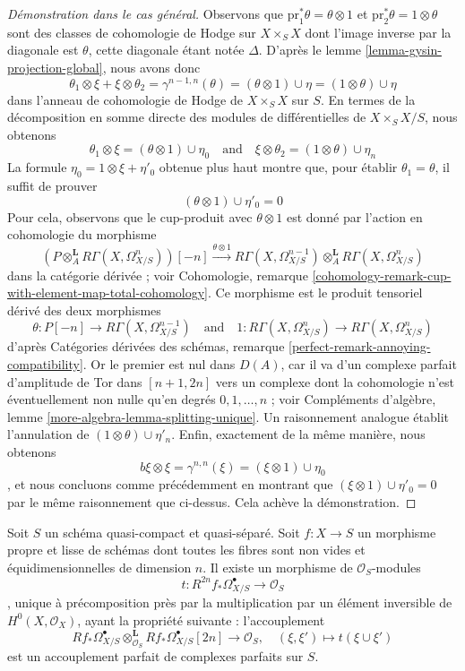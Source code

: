\begin{proof}[Démonstration dans le cas général]
\medskip\noindent
Observons que $\text{pr}_1^*\theta = \theta \otimes 1$
et $\text{pr}_2^*\theta = 1 \otimes \theta$ sont des
classes de cohomologie de Hodge sur
$X \times_S X$ dont l'image inverse par la diagonale est $\theta$, cette diagonale étant notée $\Delta$.
D'après le lemme \ref{lemma-gysin-projection-global}, nous avons donc
$$
\theta_1 \otimes \xi + \xi \otimes \theta_2 =
\gamma^{n - 1, n}(\theta) =
(\theta \otimes 1) \cup \eta =
(1 \otimes \theta) \cup \eta
$$
dans l'anneau de cohomologie de Hodge de $X \times_S X$ sur $S$.
En termes de la décomposition en somme directe des modules
de différentielles de $X \times_S X/S$, nous obtenons
$$
\theta_1 \otimes \xi =
(\theta \otimes 1) \cup \eta_0
\quad\text{and}\quad
\xi \otimes \theta_2 =
(1 \otimes \theta) \cup \eta_n
$$
La formule $\eta_0 = 1 \otimes \xi + \eta'_0$ obtenue plus haut
montre que, pour établir $\theta_1 = \theta$, il suffit de prouver
$$
(\theta \otimes 1) \cup \eta'_0 = 0
$$
Pour cela, observons que le cup-produit avec $\theta \otimes 1$ est donné
par l'action en cohomologie du morphisme
$$
(P \otimes_A^\mathbf{L} R\Gamma(X, \Omega^n_{X/S}))[-n]
\xrightarrow{\theta \otimes 1}
R\Gamma(X, \Omega^{n - 1}_{X/S}) \otimes_A^\mathbf{L}
R\Gamma(X, \Omega^n_{X/S})
$$
dans la catégorie dérivée ; voir Cohomologie, remarque
\ref{cohomology-remark-cup-with-element-map-total-cohomology}.
Ce morphisme est le produit tensoriel dérivé des deux morphismes
$$
\theta : P[-n] \to R\Gamma(X, \Omega^{n - 1}_{X/S})
\quad\text{and}\quad
1 : R\Gamma(X, \Omega^n_{X/S}) \to R\Gamma(X, \Omega^n_{X/S})
$$
d'après Catégories dérivées des schémas, remarque
\ref{perfect-remark-annoying-compatibility}.
Or le premier est nul dans $D(A)$, car il va
d'un complexe parfait d'amplitude de Tor dans $[n + 1, 2n]$ vers un complexe
dont la cohomologie n'est éventuellement non nulle qu'en degrés $0, 1, \ldots, n$ ; voir
Compléments d'algèbre, lemme \ref{more-algebra-lemma-splitting-unique}.
Un raisonnement analogue établit l'annulation de
$(1 \otimes \theta) \cup \eta'_n$. Enfin,
exactement de la même manière, nous obtenons
$$
b \xi \otimes \xi = \gamma^{n, n}(\xi) = (\xi \otimes 1) \cup \eta_0
$$,
et nous concluons comme précédemment en montrant que
$(\xi \otimes 1) \cup \eta'_0 = 0$ par le même raisonnement que ci-dessus.
Cela achève la démonstration.
\end{proof}

\begin{proposition}
\label{proposition-relative-poincare-duality}
Soit $S$ un schéma quasi-compact et quasi-séparé. Soit $f : X \to S$
un morphisme propre et lisse de schémas dont toutes les fibres sont non vides
et équidimensionnelles de dimension $n$. Il existe un morphisme de
$\mathcal{O}_S$-modules
$$
t : R^{2n}f_*\Omega^\bullet_{X/S} \longrightarrow \mathcal{O}_S
$$,
unique à précomposition près par la multiplication par un élément inversible de
$H^0(X, \mathcal{O}_X)$, ayant la propriété suivante : l'accouplement
$$
Rf_*\Omega^\bullet_{X/S}
\otimes_{\mathcal{O}_S}^\mathbf{L}
Rf_*\Omega^\bullet_{X/S}[2n]
\longrightarrow
\mathcal{O}_S, \quad
(\xi, \xi') \longmapsto t(\xi \cup \xi')
$$
est un accouplement parfait de complexes parfaits sur $S$.
\end{proposition}

